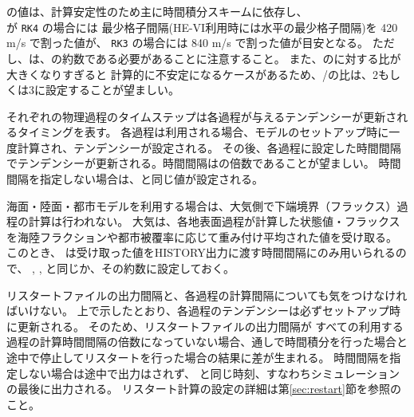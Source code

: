 の値は、計算安定性のため主に時間積分スキームに依存し、\\
 が \verb|RK4| の場合には
最少格子間隔(HE-VI利用時には水平の最少格子間隔)を 420 m/s で割った値が、
\verb|RK3| の場合には 840 m/s で割った値が目安となる。
ただし、は、の約数である必要があることに注意すること。
また、のに対する比が大きくなりすぎると
計算的に不安定になるケースがあるため、/の比は、2もしくは3に設定することが望ましい。


それぞれの物理過程のタイムステップは各過程が与えるテンデンシーが更新されるタイミングを表す。
各過程は利用される場合、モデルのセットアップ時に一度計算され、テンデンシーが設定される。
その後、各過程に設定した時間間隔でテンデンシーが更新される。時間間隔はの倍数であることが望ましい。
時間間隔を指定しない場合は、と同じ値が設定される。


海面・陸面・都市モデルを利用する場合は、大気側で下端境界（フラックス）過程の計算は行われない。
大気は、各地表面過程が計算した状態値・フラックスを海陸フラクションや都市被覆率に応じて重み付け平均された値を受け取る。
このとき、 は受け取った値をHISTORY出力に渡す時間間隔にのみ用いられるので、
, ,  と同じか、その約数に設定しておく。

リスタートファイルの出力間隔と、各過程の計算間隔についても気をつけなければいけない。
上で示したとおり、各過程のテンデンシーは必ずセットアップ時に更新される。
そのため、リスタートファイルの出力間隔が
すべての利用する過程の計算時間間隔の倍数になっていない場合、通しで時間積分を行った場合と
途中で停止してリスタートを行った場合の結果に差が生まれる。
時間間隔を指定しない場合は途中で出力はされず、
と同じ時刻、すなわちシミュレーションの最後に出力される。
リスタート計算の設定の詳細は第\ref{sec:restart}節を参照のこと。


